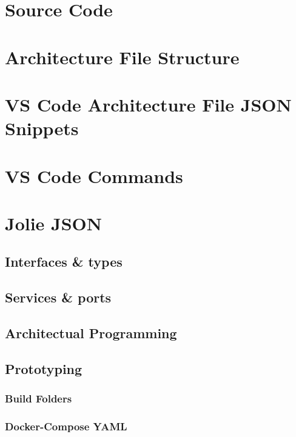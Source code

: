 \appendixpage\noappendicestocpagenum\addappheadtotoc\chapter{Source Code}\label{appen:source_code}


\chapter{Architecture File Structure}\label{appen:architecture-file-structure}


\chapter{VS Code Architecture File JSON Snippets}\label{appen:vscode_snippets}


\chapter{VS Code Commands}\label{appen:vscode_commands}


\chapter{Jolie JSON}
\section{Interfaces \& types}\label{appen:joliejson_iface_types}


\section{Services \& ports}\label{appen:joliejson_services}


\section{Architectual Programming}\label{appen:joliejson_architecture}


\section{Prototyping}
\subsection{Build Folders}\label{appen:joliejson_prototype}

\subsection{Docker-Compose YAML}\label{appen:docker_yaml}

